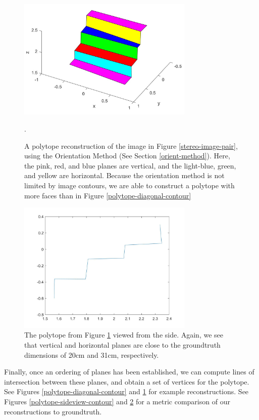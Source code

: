 \begin{figure}[!h]
\centering
\includegraphics[width=3.3in]{Sections/Figures/polytope_diagonal_geom.jpg}
\caption{A polytope reconstruction of the image in Figure \ref{stereo-image-pair}, using the Orientation Method (See Section \ref{orient-method}). Here, the pink, red, and blue planes are vertical, and the light-blue, green, and yellow are horizontal. Because the orientation method is not limited by image contours, we are able to construct a polytope with more faces than in Figure \ref{polytope-diagonal-contour}}.
\label{polytope-diagonal-orient}
\end{figure}

\begin{figure}[!h]
\centering
\includegraphics[width=3.3in]{Sections/Figures/geom_sideview_2d.jpg}
\caption{The polytope from Figure \ref{polytope-diagonal-orient} viewed from the side. Again, we see that vertical and horizontal planes are close to the groundtruth dimensions of 20cm and 31cm, respectively.}
\label{polytope-sideview-orient}
\end{figure}

Finally, once an ordering of planes has been established, we can compute lines of intersection between these planes, and obtain a set of vertices for the polytope. See Figures \ref{polytope-diagonal-contour} and \ref{polytope-diagonal-orient} for example reconstructions. See Figures \ref{polytope-sideview-contour} and \ref{polytope-sideview-orient} for a metric comparison of our reconstructions to groundtruth.

